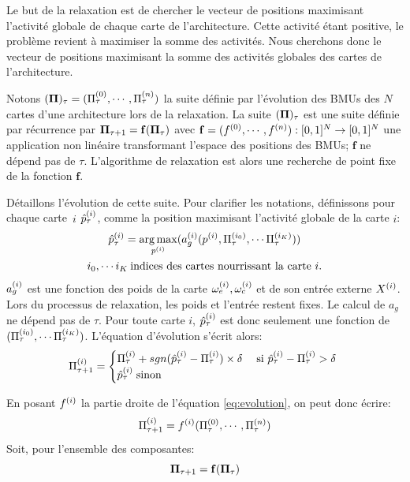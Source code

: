 \documentclass[../main]{subfiles}
\begin{document}
Le but de la relaxation est de chercher le vecteur de positions maximisant l'activité globale de chaque carte de l'architecture.
Cette activité étant positive, le problème revient à maximiser la somme des activités. Nous cherchons donc le vecteur de positions maximisant la somme des activités globales des cartes de l'architecture.


Notons $(\mathbf{\Pi})_\tau = (\Pi^{({0})}_\tau,\cdots,\Pi^{({n})}_\tau)$ la suite définie par l'évolution des BMUs des $N$ cartes d'une architecture lors de la relaxation.
La suite $(\mathbf{\Pi})_\tau$ est une suite définie par récurrence par $\mathbf{\Pi}_{\tau+1} = \mathbf{f}(\mathbf{\Pi}_\tau)$ avec $\mathbf{f} = (f^{({0})},\cdots,f^{({n})}) : [0,1]^N \rightarrow [0,1]^N$ une application non linéaire transformant l'espace des positions des BMUs; $\mathbf{f}$ ne dépend pas de $\tau$. 
L'algorithme de relaxation est alors une recherche de point fixe de la fonction $\mathbf{f}$.


Détaillons l'évolution de cette suite.
Pour clarifier les notations, définissons pour chaque carte~$i$ $\hat{p}^{({i})}_\tau$, comme la position maximisant l'activité globale de la carte $i$:
\begin{equation}
\begin{gathered}
\hat{p}^{({i})}_{\tau} = \operatorname*{arg\,max}_{p^{({i})}}(a_g^{({i})}(p^{({i})},\Pi^{({i_0})}_\tau, \cdots \Pi^{({i_K})}_\tau))\\
 i_0, \cdots i_K \: \text{indices des cartes nourrissant la carte $i$}.
\end{gathered}
\label{eq:pstar}
\end{equation}
$a_g^{({i})}$ est une fonction des poids de la carte $\omega_{e}^{({i})}, \omega_{c}^{({i})}$ et de son entrée externe $X^{({i})}$. Lors du processus de relaxation, les poids et l'entrée restent fixes. Le calcul de $a_g$ ne dépend pas de $\tau$. Pour toute carte $i$, $\hat{p}^{({i})}_{\tau}$ est donc seulement une fonction de $(\Pi^{({i_0})}_\tau, \cdots \Pi^{({i_K})}_\tau)$.
L'équation d'évolution s'écrit alors: 
\begin{equation}
\Pi^{({i})}_{\tau+1} = 
\begin{cases}
\Pi^{({i})}_{\tau} + sgn(\hat{p}^{({i})}_{\tau} - \Pi^{({i})}_{\tau}) \times \delta \; & \text{si $\hat{p}^{({i})}_{\tau} - \Pi^{({i})}_{\tau} > \delta$ } \\
\hat{p}^{({i})}_{\tau} \; \text{sinon}	
\end{cases}
\label{eq:evolution}
\end{equation}

En posant $f^{({i})}$ la partie droite de l'équation \ref{eq:evolution}, on peut donc écrire: 
\begin{equation}
\Pi^{({i})}_{\tau +1} = f^{({i})}(\Pi^{({0})}_\tau,\cdots,\Pi^{({n})}_\tau)
\label{eq:fonction}
\end{equation}
Soit, pour l'ensemble des composantes: 
\begin{equation}
\mathbf{\Pi}_{\tau+1} = \mathbf{f}(\mathbf{\Pi}_\tau)
\end{equation}
\end{document}
